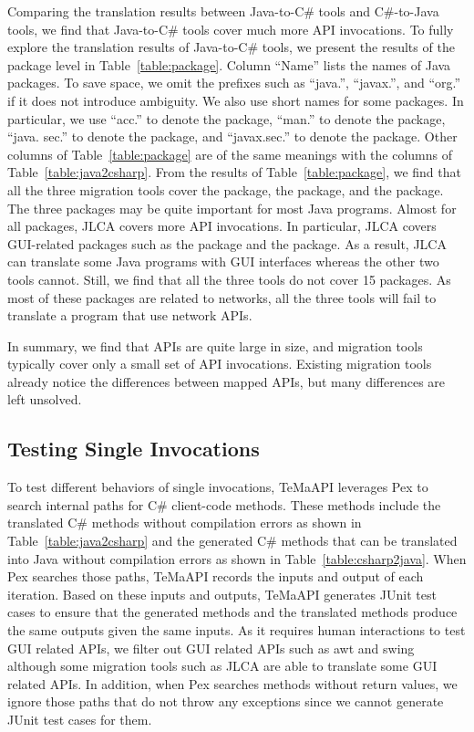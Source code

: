 Comparing the translation results between Java-to-C\# tools and C\#-to-Java tools, we find that Java-to-C\# tools cover much more API invocations. To fully explore the translation results of Java-to-C\# tools, we present the results of the package level in Table~\ref{table:package}. Column ``Name'' lists the names of Java packages. To save space, we omit the prefixes such as ``java.'', ``javax.'', and ``org.'' if it does not introduce ambiguity. We also use short names for some packages. In particular, we use ``acc.'' to denote the  package, ``man.'' to denote the  package, ``java. sec.'' to denote the  package, and ``javax.sec.'' to denote the  package. Other columns of Table~\ref{table:package} are of the same meanings with the columns of Table~\ref{table:java2csharp}. From the results of Table~\ref{table:package}, we find that all the three migration tools cover the  package, the  package, and the  package. The three packages may be quite important for most Java programs. Almost for all packages, JLCA covers more API invocations. In particular, JLCA covers GUI-related packages such as the  package and the  package. As a result, JLCA can translate some Java programs with GUI interfaces whereas the other two tools cannot. Still, we find that all the three tools do not cover 15 packages. As most of these packages are related to networks, all the three tools will fail to translate a program that use network APIs.


In summary, we find that APIs are quite large in size, and migration tools typically cover only a small set of API invocations. Existing migration tools already notice the differences between mapped APIs, but many differences are left unsolved.
\subsection{Testing Single Invocations}
\label{sec:evaluation:single}


To test different behaviors of single invocations, TeMaAPI leverages Pex to search internal paths for C\# client-code methods. These methods include the translated C\# methods without compilation errors as shown in Table~\ref{table:java2csharp} and the generated C\# methods that can be translated into Java without compilation errors as shown in Table~\ref{table:csharp2java}. When Pex searches those paths, TeMaAPI records the inputs and output of each iteration. Based on these inputs and outputs, TeMaAPI generates JUnit test cases to ensure that the generated methods and the translated methods produce the same outputs given the same inputs. As it requires human interactions to test GUI related APIs, we filter out GUI related APIs such as awt and swing although some migration tools such as JLCA are able to translate some GUI related APIs. In addition, when Pex searches methods without return values, we ignore those paths that do not throw any exceptions since we cannot generate JUnit test cases for them.


